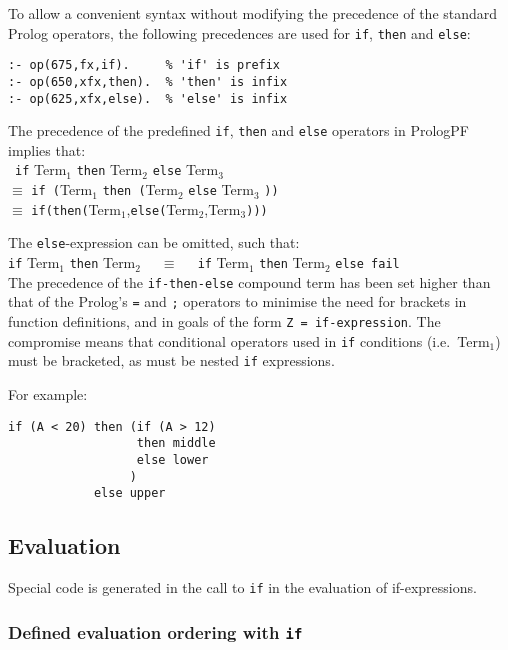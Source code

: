 To allow a convenient syntax without modifying the precedence of the standard
Prolog operators, the following precedences are used for \texttt{if},
\texttt{then} and \texttt{else}:
\begin{verbatim}
:- op(675,fx,if).     % 'if' is prefix
:- op(650,xfx,then).  % 'then' is infix
:- op(625,xfx,else).  % 'else' is infix
\end{verbatim}
The precedence of the predefined \texttt{if}, \texttt{then} and \texttt{else}
operators in PrologPF implies that:\\\
\texttt{if} Term$_1$ \texttt{then} Term$_2$ \texttt{else} Term$_3$\\
$\equiv$ \texttt{if (}Term$_1$ \texttt{then (}Term$_2$ \texttt{else} Term$_3$ \texttt{))}\\
$\equiv$ \texttt{if(}\texttt{then(}Term$_1$,\texttt{else(}Term$_2$,Term$_3$\texttt{)))}

The \texttt{else}-expression can be omitted, such that:\\
\texttt{if} Term$_1$ \texttt{then} Term$_2$ \texttt{~~}$\equiv$
\texttt{~~if} Term$_1$ \texttt{then} Term$_2$ \texttt{else fail}\\

The precedence of the \texttt{if-then-else} compound term has been set
higher than that of the Prolog's \texttt{=} and \texttt{;} operators
to minimise the need
for brackets in function definitions, and in goals of the form
\texttt{Z = if-expression}.  The compromise means that conditional
operators used in \texttt{if} conditions (i.e.\ Term$_1$) must
be bracketed, as must be nested \texttt{if} expressions.

For example:
\begin{verbatim}
if (A < 20) then (if (A > 12)
                  then middle
                  else lower
                 )
            else upper
\end{verbatim}

\subsection{Evaluation}

Special code is generated in the call to \texttt{if} in the evaluation of
if-expressions.

\subsubsection{Defined evaluation ordering with \texttt{if}}

